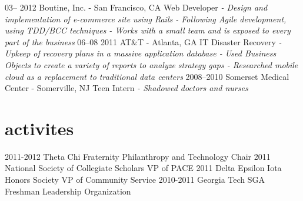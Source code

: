 \documentclass[]{cv}
\begin{document}
\begin{entrylist}
  \entry
    {03– 2012}
    {Boutine, Inc. - San Francisco, CA}
    {Web Developer}
    {\emph{- Design and implementation of e-commerce site using Rails
    \newline - Following Agile development, using TDD/BCC techniques
    \newline - Works with a small team and is exposed to every part of the business\newline}}
  \entry
    {06–08 2011}
    {AT\&T - Atlanta, GA}
    {IT Disaster Recovery}
    {\emph{- Upkeep of recovery plans in a massive application database
    \newline - Used Business Objects to create a variety of reports to analyze strategy gaps
    \newline - Researched mobile cloud as a replacement to traditional data centers\newline}}
  \entry
    {2008–2010}
    {Somerset Medical Center - Somerville, NJ}
    {Teen Intern}
    {\emph{- Shadowed doctors and nurses\newline}}
\end{entrylist}

\section{activites}

\begin{entrylist}
  \entry
    {2011-2012}
    {Theta Chi Fraternity}
    {Philanthropy and Technology Chair}
    {}
  \entry
    {2011}
    {National Society of Collegiate Scholars}
    {VP of PACE}
    {}
  \entry
    {2011}
    {Delta Epsilon Iota Honors Society}
    {VP of Community Service}
    {}
  \entry
    {2010-2011}
    {Georgia Tech SGA}
    {Freshman Leadership Organization}
    {}
\end{entrylist}
\end{document}
